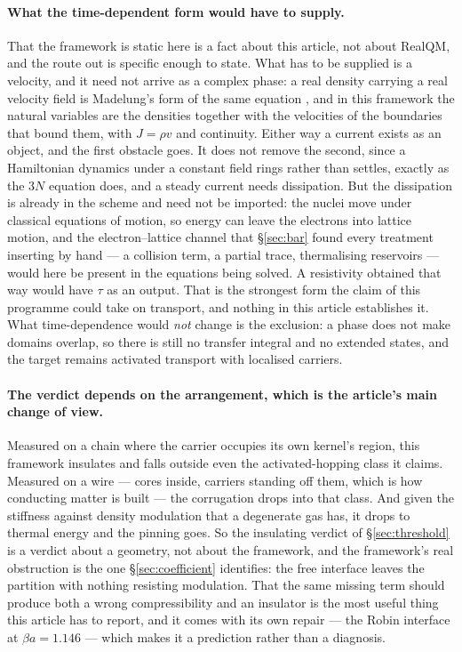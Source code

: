 \documentclass[11pt]{article}
\begin{document}
\paragraph{What the time-dependent form would have to supply.} That the framework is static here is
a fact about this article, not about RealQM, and the route out is specific enough to state. What has
to be supplied is a velocity, and it need not arrive as a complex phase: a real density carrying a
real velocity field is Madelung's form of the same equation \cite{madelung}, and in this framework
the natural variables are the densities together with the velocities of the boundaries that bound
them, with $J=\rho v$ and continuity. Either way a current exists as an object, and the first
obstacle goes. It does not remove the second, since a Hamiltonian
dynamics under a constant field rings rather than settles, exactly as the $3N$ equation does, and a
steady current needs dissipation. But the dissipation is already in the scheme and need not be
imported: the nuclei move under classical equations of motion, so energy can leave the electrons
into lattice motion, and the electron--lattice channel that \S\ref{sec:bar} found every treatment
inserting by hand --- a collision term, a partial trace, thermalising reservoirs --- would here be
present in the equations being solved. A resistivity obtained that way would have $\tau$ as an
output. That is the strongest form the claim of this programme could take on transport, and nothing
in this article establishes it. What time-dependence would \emph{not} change is the exclusion:
a phase does not make domains overlap, so there is still no transfer integral and no extended
states, and the target remains activated transport with localised carriers.

\paragraph{The verdict depends on the arrangement, which is the article's main change of view.}
Measured on a chain where the carrier occupies its own kernel's region, this framework insulates and
falls outside even the activated-hopping class it claims. Measured on a wire --- cores inside,
carriers standing off them, which is how conducting matter is built --- the corrugation drops into
that class. And given the stiffness against density modulation that a degenerate gas has, it drops to
thermal energy and the pinning goes. So the insulating verdict of \S\ref{sec:threshold} is a verdict
about a geometry, not about the framework, and the framework's real obstruction is the one
\S\ref{sec:coefficient} identifies: the free interface leaves the partition with nothing resisting
modulation.
That the same missing term should produce both a wrong compressibility and an insulator is the most
useful thing this article has to report, and it comes with its own repair --- the Robin interface at
$\beta a=1.146$ --- which makes it a prediction rather than a diagnosis.
\end{document}
